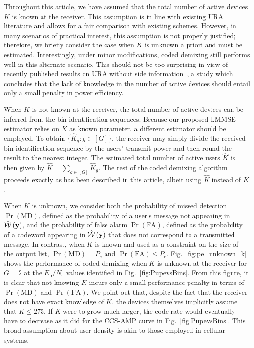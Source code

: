 \documentclass[journal]{IEEEtran}
\begin{document}
Throughout this article, we have assumed that the total number of active devices $K$ is known at the receiver.
This assumption is in line with existing URA literature and allows for a fair comparison with existing schemes.
However, in many scenarios of practical interest, this assumption is not properly justified; therefore, we briefly consider the case when $K$ is unknown a priori and must be estimated. 
Interestingly, under minor modifications, coded demixing still performs well in this alternate scenario. 
This should not be too surprising in view of recently published results on URA without side information~\cite{ngo2021massive}, a study which concludes that the lack of knowledge in the number of active devices should entail only a small penalty in power efficiency.

When $K$ is not known at the receiver, the total number of active devices can be inferred from the bin identification sequences.
Because our proposed LMMSE estimator relies on $K$ as known parameter, a different estimator should be employed. 
To obtain $\{\hat{K}_g : g \in [G]\}$, the receiver may simply divide the received bin identification sequence by the users' transmit power and then round the result to the nearest integer. 
The estimated total number of active users $\hat{K}$ is then given by $\hat{K} = \sum_{g \in [G]} \hat{K}_g$. 
The rest of the coded demixing algorithm proceeds exactly as has been described in this article, albeit using $\hat{K}$ instead of $K$.

When $K$ is unknown, we consider both the probability of missed detection $\Pr\left(\mathrm{MD}\right)$, defined as the probability of a user's message not appearing in $\hat{\mathcal{W}}\left(\mathbf{y}\right)$, and the probability of false alarm $\Pr\left(\mathrm{FA}\right)$, defined as the probability of a codeword appearing in $\hat{\mathcal{W}}\left(\mathbf{y}\right)$ that does not correspond to a transmitted message. 
In contrast, when $K$ is known and used as a constraint on the size of the output list, $\Pr\left(\mathrm{MD}\right) = P_e$ and $\Pr\left(\mathrm{FA}\right) \leq P_e$. 
Fig.~\ref{fig:pe_unknown_k} shows the performance of coded demixing when $K$ is unknown at the receiver for $G = 2$ at the $E_{\mathrm{b}}/N_0$ values identified in Fig.~\ref{fig:PupevsBins}. 
From this figure, it is clear that not knowing $K$ incurs only a small performance penalty in terms of $\Pr\left(\mathrm{MD}\right)$ and $\Pr\left(\mathrm{FA}\right)$. 
We point out that, despite the fact that the receiver does not have exact knowledge of $K$, the devices themselves implicitly assume that $K \leq 275$.
If $K$ were to grow much larger, the code rate would eventually have to decrease as it did for the CCS-AMP curve in Fig.~\ref{fig:PupevsBins}.
This broad assumption about user density is akin to those employed in cellular systems.
\end{document}
